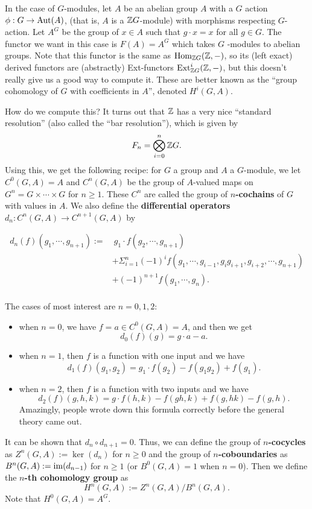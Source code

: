 \begin{example}
In the case of $G$-modules, let $A$ be an abelian group $A$ with a $G$ action $\phi: G\to \operatorname{Aut}(A)$, (that is, $A$ is a ${\mathbb Z} G$-module) with morphisms respecting $G$-action. Let $A^G$ be the group of $x\in A$ such that $g\cdot x=x$ for all $g\in G$. The functor we want in this case is $F(A)=A^G$ which takes $G$ -modules to abelian groups. Note that this functor is the same as $\operatorname{Hom}_{{\mathbb Z} G}({\mathbb Z},-)$, so its (left exact) derived functors are (abstractly) Ext-functors $\operatorname{Ext}_{{\mathbb Z} G}^i({\mathbb Z},-)$, but this doesn't really give us a good way to compute it. These are better known as the ``group cohomology of $G$ with coefficients in $A$'', denoted $H^i(G,A)$. 

How do we compute this? 
It turns out that ${\mathbb Z}$ has a very nice ``standard resolution'' (also called the ``bar resolution''), which is given by 
$$F_n=\bigotimes_{i=0}^n {\mathbb Z} G.$$
Using this, we get the following recipe: for $G$ a group and $A$ a $G$-module, we let $C^0(G,A)=A$ and $C^n(G,A)$ be the group of $A$-valued maps on $G^n=G\times \cdots\times G$ for $n\geq 1$. These $C^n$ are called the group of \textbf{$n$-cochains} of $G$ with values in $A$. We also define the \textbf{differential operators} $d_n: C^n(G,A)\to C^{n+1}(G,A)$ by 

\begin{align*}
d_n(f)(g_1,\cdots, g_{n+1}):= 
&\ g_1\cdot f(g_2,\cdots, g_{n+1})\\
&+\Sigma_{i=1}^n (-1)^i f(g_1,\cdots, g_{i-1},g_ig_{i+1},g_{i+2},\cdots, g_{n+1})\\
&+(-1)^{n+1}f(g_1,\cdots, g_n).\\
\end{align*}

The cases of most interest are $n=0,1,2$:
\begin{itemize}
\item when $n=0$, we have $f=a\in C^0(G,A)=A$, and then we get 
$$d_0(f)(g)=g\cdot a - a.$$
\item when $n=1$, then $f$ is a function with one input and we have
$$d_1(f)(g_1,g_2)=g_1\cdot f(g_2)-f(g_1g_2)+f(g_1).$$
\item when $n=2$, then $f$ is a function with two inputs and we have
$$d_2(f)(g,h,k)=g\cdot f(h,k) - f(gh,k)+f(g,hk)- f(g,h).$$
Amazingly, people wrote down this formula correctly before the general theory came out.
\end{itemize}

It can be shown that $d_n\circ d_{n+1}=0$. Thus, we can define the group of \textbf{$n$-cocycles} as $Z^n(G,A):=\ker(d_n)$ for $n\geq 0$ and the group of \textbf{$n$-coboundaries} as $B^n(G,A):=\operatorname{im}(d_{n-1})$ for $n\geq 1$ (or $B^0(G,A)=1$ when $n=0$). Then we define the \textbf{$n$-th cohomology group} as
$$H^n(G,A):=Z^n(G,A)/B^n(G,A).$$
Note that $H^0(G,A)=A^G$. 
\end{example}

